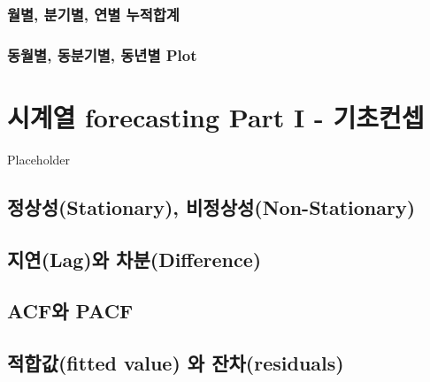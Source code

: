 \documentclass[
]{book}
\begin{document}
\hypertarget{uxc6d4uxbcc4-uxbd84uxae30uxbcc4-uxc5f0uxbcc4-uxb204uxc801uxd569uxacc4}{%
\subsection{월별, 분기별, 연별 누적합계}\label{uxc6d4uxbcc4-uxbd84uxae30uxbcc4-uxc5f0uxbcc4-uxb204uxc801uxd569uxacc4}}

\hypertarget{uxb3d9uxc6d4uxbcc4-uxb3d9uxbd84uxae30uxbcc4-uxb3d9uxb144uxbcc4-plot}{%
\subsection{동월별, 동분기별, 동년별 Plot}\label{uxb3d9uxc6d4uxbcc4-uxb3d9uxbd84uxae30uxbcc4-uxb3d9uxb144uxbcc4-plot}}

\hypertarget{uxc2dcuxacc4uxc5f4-forecasting-part-i---uxae30uxcd08uxcee8uxc149}{%
\chapter{시계열 forecasting Part I - 기초컨셉}\label{uxc2dcuxacc4uxc5f4-forecasting-part-i---uxae30uxcd08uxcee8uxc149}}

Placeholder

\hypertarget{uxc815uxc0c1uxc131stationary-uxbe44uxc815uxc0c1uxc131non-stationary}{%
\section{정상성(Stationary), 비정상성(Non-Stationary)}\label{uxc815uxc0c1uxc131stationary-uxbe44uxc815uxc0c1uxc131non-stationary}}

\hypertarget{uxc9c0uxc5f0laguxc640-uxcc28uxbd84difference}{%
\section{지연(Lag)와 차분(Difference)}\label{uxc9c0uxc5f0laguxc640-uxcc28uxbd84difference}}

\hypertarget{acfuxc640-pacf}{%
\section{ACF와 PACF}\label{acfuxc640-pacf}}

\hypertarget{uxc801uxd569uxac12fitted-value-uxc640-uxc794uxcc28residuals}{%
\section{적합값(fitted value) 와 잔차(residuals)}\label{uxc801uxd569uxac12fitted-value-uxc640-uxc794uxcc28residuals}}
\end{document}
